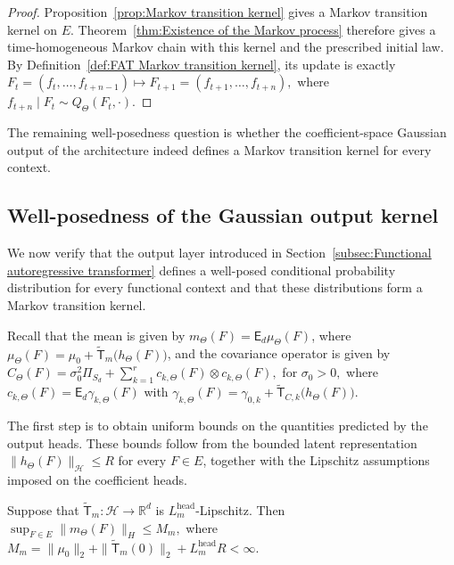 \begin{proof}
Proposition~\ref{prop:Markov transition kernel} gives a Markov transition kernel on \(E\). Theorem~\ref{thm:Existence of the Markov process} therefore gives a time-homogeneous Markov chain with this kernel and the prescribed initial law. By Definition~\ref{def:FAT Markov transition kernel}, its update is exactly
\(
F_t=(f_t,\ldots,f_{t+n-1})
\longmapsto
F_{t+1}=(f_{t+1},\ldots,f_{t+n}),
\)
where \(f_{t+n}\mid F_t\sim Q_\Theta(F_t,\cdot)\).
\end{proof}

The remaining well-posedness question is whether the coefficient-space Gaussian output of the architecture indeed defines a Markov transition kernel for every context.

\subsection{Well-posedness of the Gaussian output kernel}
\label{subsec:Well-posedness of Markov transition kernels}

We now verify that the output layer introduced in Section~\ref{subsec:Functional autoregressive transformer} defines a well-posed conditional probability distribution for every functional context and that these distributions form a Markov transition kernel.

Recall that the mean is given by \(m_\Theta(F)=\mathsf E_d\mu_\Theta(F)\), where
\(
\mu_\Theta(F)
=
\mu_0+\widetilde{\mathsf T}_m\bigl(h_\Theta(F)\bigr)
\), and the covariance operator is given by
\(
C_\Theta(F)
=
\sigma_0^2\Pi_{S_d}
+
\sum_{k=1}^r
c_{k,\Theta}(F)\otimes c_{k,\Theta}(F),\)
for 
\(
\sigma_0>0,
\)
where
\(c_{k,\Theta}(F)=\mathsf E_d\gamma_{k,\Theta}(F)\)
with
\(
\gamma_{k,\Theta}(F)
=
\gamma_{0,k}
+\widetilde{\mathsf T}_{C,k}\bigl(h_\Theta(F)\bigr).
\)


The first step is to obtain uniform bounds on the quantities predicted by the output heads. These bounds follow from the bounded latent representation \(\|h_\Theta(F)\|_{\mathcal H}\leqslant R\) for every \(F\in E\), together with the Lipschitz assumptions imposed on the coefficient heads.

\begin{proposition}
\label{prop:Uniform bound for the mean}
Suppose that \(\widetilde{\mathsf T}_m:\mathcal H\to\mathbb R^d\) is \(L_m^{\mathrm{head}}\)-Lipschitz. Then
\(
\sup_{F\in E}\|m_\Theta(F)\|_H
\leqslant
M_m,
\)
where
\(
M_m
=
\|\mu_0\|_2
+
\|\widetilde{\mathsf T}_m(0)\|_2
+
L_m^{\mathrm{head}}R
<\infty.
\)
\end{proposition}

